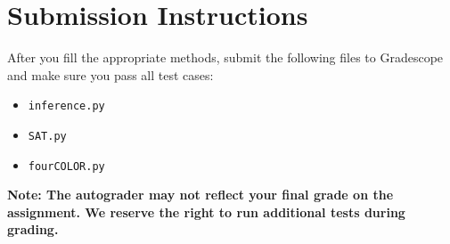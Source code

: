 \documentclass{article}
\begin{document}
\section{Submission Instructions}
    After you fill the appropriate methods, submit the following files to Gradescope and make sure you pass all test cases:
    \begin{itemize}
        \item \lstinline{inference.py}
        \item \lstinline{SAT.py}
        \item \lstinline{fourCOLOR.py}
    \end{itemize}

    \vspace{3mm}
    \textbf{Note: The autograder may not reflect your final grade on the assignment. We reserve the right to run additional tests during grading.}
    
\end{document}
